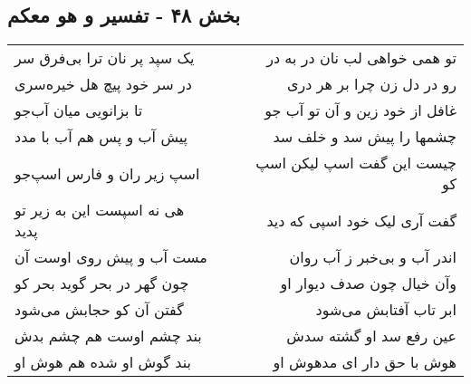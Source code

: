 \begin{center}
\section*{بخش ۴۸ - تفسیر و هو معکم}
\label{sec:sh048}
\begin{longtable}{l p{0.5cm} r}
یک سپد پر نان ترا بی‌فرق سر
&&
تو همی خواهی لب نان در به در
\\
در سر خود پیچ هل خیره‌سری
&&
رو در دل زن چرا بر هر دری
\\
تا بزانویی میان آب‌جو
&&
غافل از خود زین و آن تو آب جو
\\
پیش آب و پس هم آب با مدد
&&
چشمها را پیش سد و خلف سد
\\
اسپ زیر ران و فارس اسپ‌جو
&&
چیست این گفت اسپ لیکن اسپ کو
\\
هی نه اسپست این به زیر تو پدید
&&
گفت آری لیک خود اسپی که دید
\\
مست آب و پیش روی اوست آن
&&
اندر آب و بی‌خبر ز آب روان
\\
چون گهر در بحر گوید بحر کو
&&
وآن خیال چون صدف دیوار او
\\
گفتن آن کو حجابش می‌شود
&&
ابر تاب آفتابش می‌شود
\\
بند چشم اوست هم چشم بدش
&&
عین رفع سد او گشته سدش
\\
بند گوش او شده هم هوش او
&&
هوش با حق دار ای مدهوش او
\\
\end{longtable}
\end{center}
